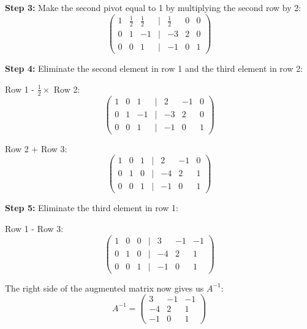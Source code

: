 \textbf{Step 3:} Make the second pivot equal to 1 by multiplying the second row by 2:
\begin{equation*}
\begin{pmatrix}
1 & \frac{1}{2} & \frac{1}{2} & | & \frac{1}{2} & 0 & 0 \\
0 & 1 & -1 & | & -3 & 2 & 0 \\
0 & 0 & 1 & | & -1 & 0 & 1
\end{pmatrix}
\end{equation*}

\textbf{Step 4:} Eliminate the second element in row 1 and the third element in row 2:

Row 1 - \(\frac{1}{2} \times\) Row 2:
\begin{equation*}
\begin{pmatrix}
1 & 0 & 1 & | & 2 & -1 & 0 \\
0 & 1 & -1 & | & -3 & 2 & 0 \\
0 & 0 & 1 & | & -1 & 0 & 1
\end{pmatrix}
\end{equation*}

Row 2 + Row 3:
\begin{equation*}
\begin{pmatrix}
1 & 0 & 1 & | & 2 & -1 & 0 \\
0 & 1 & 0 & | & -4 & 2 & 1 \\
0 & 0 & 1 & | & -1 & 0 & 1
\end{pmatrix}
\end{equation*}

\textbf{Step 5:} Eliminate the third element in row 1:

Row 1 - Row 3:
\begin{equation*}
\begin{pmatrix}
1 & 0 & 0 & | & 3 & -1 & -1 \\
0 & 1 & 0 & | & -4 & 2 & 1 \\
0 & 0 & 1 & | & -1 & 0 & 1
\end{pmatrix}
\end{equation*}

The right side of the augmented matrix now gives us \(A^{-1}\):
\begin{equation*}
A^{-1} = 
\begin{pmatrix}
3 & -1 & -1 \\
-4 & 2 & 1 \\
-1 & 0 & 1
\end{pmatrix}
\end{equation*}

